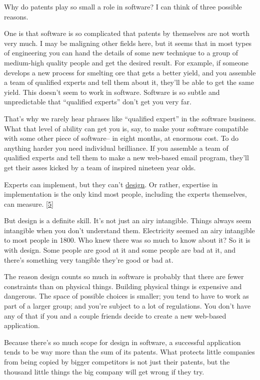 Why do patents play so small a role in software? I can think of three
possible reasons.

One is that software is so complicated that patents by themselves are
not worth very much. I may be maligning other fields here, but it seems
that in most types of engineering you can hand the details of some new
technique to a group of medium-high quality people and get the desired
result. For example, if someone develops a new process for smelting ore
that gets a better yield, and you assemble a team of qualified experts
and tell them about it, they'll be able to get the same yield. This
doesn't seem to work in software. Software is so subtle and
unpredictable that ``qualified experts'' don't get you very far.

That's why we rarely hear phrases like ``qualified expert'' in the
software business. What that level of ability can get you is, say, to
make your software compatible with some other piece of software-- in
eight months, at enormous cost. To do anything harder you need
individual brilliance. If you assemble a team of qualified experts and
tell them to make a new web-based email program, they'll get their asses
kicked by a team of inspired nineteen year olds.

Experts can implement, but they can't \href{taste.html}{design}. Or
rather, expertise in implementation is the only kind most people,
including the experts themselves, can measure. {[}\hyperref[f5n]{5}{]}

But design is a definite skill. It's not just an airy intangible. Things
always seem intangible when you don't understand them. Electricity
seemed an airy intangible to most people in 1800. Who knew there was so
much to know about it? So it is with design. Some people are good at it
and some people are bad at it, and there's something very tangible
they're good or bad at.

The reason design counts so much in software is probably that there are
fewer constraints than on physical things. Building physical things is
expensive and dangerous. The space of possible choices is smaller; you
tend to have to work as part of a larger group; and you're subject to a
lot of regulations. You don't have any of that if you and a couple
friends decide to create a new web-based application.

Because there's so much scope for design in software, a successful
application tends to be way more than the sum of its patents. What
protects little companies from being copied by bigger competitors is not
just their patents, but the thousand little things the big company will
get wrong if they try.

